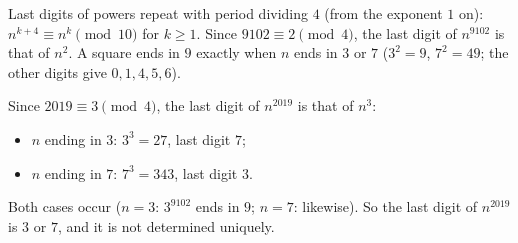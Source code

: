 Last digits of powers repeat with period dividing $4$ (from the exponent $1$ on): $n^{k+4}\equiv n^k\pmod{10}$ for $k\ge1$. Since $9102\equiv2\pmod4$, the last digit of $n^{9102}$ is that of $n^2$. A square ends in $9$ exactly when $n$ ends in $3$ or $7$ ($3^2=9$, $7^2=49$; the other digits give $0,1,4,5,6$).

Since $2019\equiv3\pmod4$, the last digit of $n^{2019}$ is that of $n^3$:
\begin{itemize}
\item $n$ ending in $3$: $3^3=27$, last digit $7$;
\item $n$ ending in $7$: $7^3=343$, last digit $3$.
\end{itemize}
Both cases occur ($n=3$: $3^{9102}$ ends in $9$; $n=7$: likewise). So the last digit of $n^{2019}$ is $\boxed{3\text{ or }7}$, and it is not determined uniquely.
